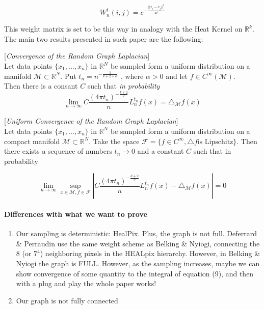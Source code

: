 $$W_n^t(i,j) = e^{-\frac{||x_i-x_j||^2}{4t}}$$

This weight matrix is set to be this way in analogy with the Heat Kernel on $\mathbb R^k$.\\

The main two results presented in such paper are the following:

\begin{theorem}{[\textit{Convergence of the Random Graph Laplacian}]}
	\\Let data points $\{x_1, ..., x_n\}$ in $\mathbb R^N$ be sampled form a uniform distribution on a manifold $\mathcal M \subset \mathbb R^N$. Put $t_n = n^{-\frac{1}{k+2+\alpha}}$ , where $\alpha>0$ and let $f\in C^\infty(\mathcal M)$.\\
	Then there is a consant $C$ such that \textit{in probability}
	$$\lim_{n\rightarrow\infty} C \frac{(4\pi t_n)^{-\frac{k+2}{2}}}{n} L_n^{t_n}f(x) = \triangle_{\mathcal M}f(x)$$
\end{theorem}

\begin{theorem}{[\textit{Uniform Convergence of the Random Graph Laplacian}]}
	\\Let data points $\{x_1, ..., x_n\}$ in $\mathbb R^N$ be sampled form a uniform distribution on a compact manifold $\mathcal M \subset \mathbb R^N$. Take the space $\mathcal F = \{f\in C^\infty , \triangle f \text{is Lipschitz}\}$. Then there exists a sequence of numbers $t_n\rightarrow 0$ and a constant $C$ such that in probability

	$$\lim_{n\rightarrow\infty} \sup_{x\in \mathcal M, f\in \mathcal F} \left| C \frac{(4\pi t_n)^{-\frac{k+2}{2}}}{n} L_n^{t_n}f(x) - \triangle_{\mathcal M}f(x) \right|= 0$$
\end{theorem}

\paragraph{Differences with what we want to prove}
\begin{enumerate}
	\item Our sampling is deterministic: HealPix. Plus, the graph is not full. Deferrard \& Perraudin use the same weight scheme as Belking \& Nyiogi, connecting the $8$ (or $7^4$) neighboring pixels in the HEALpix hierarchy. However, in Belking \& Nyiogi the graph is FULL. However, as the sampling increases, maybe we can show convergence of some quantity to the integral of equation (9), and then with a plug and play the whole paper works!
	\item Our graph is not fully connected
\end{enumerate}

